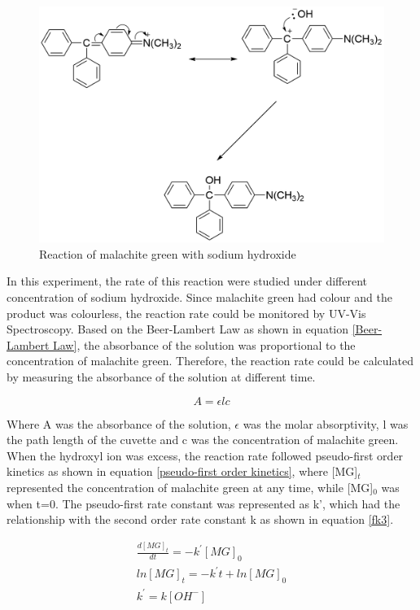 \documentclass[twocolumn]{article} %
\begin{document}
\begin{figure}[H]
    \centering
    \includegraphics[width=\columnwidth]{malachite green.png}
    \caption{Reaction of malachite green with sodium hydroxide}
    \label{malachite green}
\end{figure}


In this experiment, the rate of this reaction were studied under different concentration of sodium hydroxide. Since malachite green had colour and the product was colourless, the reaction rate could be monitored by UV-Vis Spectroscopy. Based on the Beer-Lambert Law as shown in equation \ref{Beer-Lambert Law}, the absorbance of the solution was proportional to the concentration of malachite green. Therefore, the reaction rate could be calculated by measuring the absorbance of the solution at different time. 

\begin{equation}
    \label{Beer-Lambert Law}
    A = \epsilon l c
\end{equation}

Where A was the absorbance of the solution, $\epsilon$ was the molar absorptivity, l was the path length of the cuvette and c was the concentration of malachite green. When the hydroxyl ion was excess, the reaction rate followed pseudo-first order kinetics as shown in equation \ref{pseudo-first order kinetics}, where [MG]$_t$ represented the concentration of malachite green at any time, while [MG]$_0$ was when t=0. The pseudo-first rate constant was represented as k', which had the relationship with the second order rate constant k as shown in equation \ref{fk3}.

\begin{subequations}
    \label{pseudo-first order kinetics}
    \begin{gather}
        \frac{d[MG]_t}{dt} = -k ^{\prime} [MG]_0 \label{fk1}\\
        ln[MG]_t = -k ^{\prime} t + ln[MG]_0 \label{fk2}\\
        k ^{\prime} = k [OH^-] \label{fk3}
    \end{gather}
\end{subequations}
\end{document}
